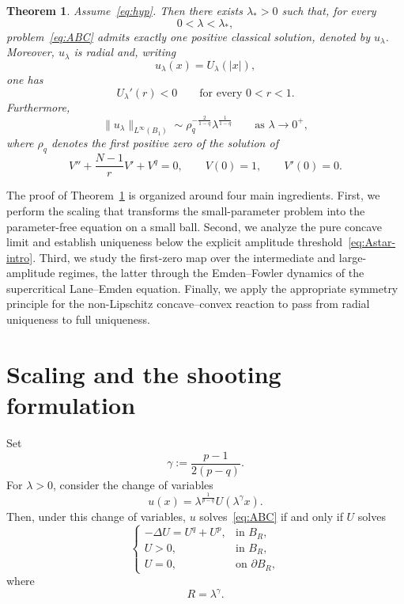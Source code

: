 \documentclass[11pt]{article}
\newtheorem{theorem}{Theorem}[section]
\theoremstyle{definition}
\begin{document}
\begin{theorem}
\label{thm:main}
Assume~\eqref{eq:hyp}. Then there exists $\lambda_*>0$ such that,
for every
\[
0<\lambda<\lambda_*,
\]
problem~\eqref{eq:ABC} admits exactly one positive classical solution,
denoted by $u_\lambda$. Moreover, $u_\lambda$ is radial and, writing
\[
u_\lambda(x)=U_\lambda(|x|),
\]
one has
\[
U_\lambda'(r)<0
\qquad
\text{for every }0<r<1.
\]
Furthermore,
\[
\|u_\lambda\|_{L^\infty(B_1)}
\sim
\rho_q^{-\frac{2}{1-q}}
\lambda^{\frac1{1-q}}
\qquad
\text{as }\lambda\to0^+,
\]
where $\rho_q$ denotes the first positive zero of the solution of
\[
V''
+\frac{N-1}{r}V'
+V^q=0,
\qquad
V(0)=1,
\qquad
V'(0)=0.
\]
\end{theorem}

The proof of Theorem~\ref{thm:main} is organized around four main
ingredients. First, we perform the scaling that transforms the
small-parameter problem into the parameter-free equation on a small
ball. Second, we analyze the pure concave limit and establish
uniqueness below the explicit amplitude threshold~\eqref{eq:Astar-intro}.
Third, we study the first-zero map over the intermediate and
large-amplitude regimes, the latter through the Emden--Fowler
dynamics of the supercritical Lane--Emden equation. Finally, we apply
the appropriate symmetry principle for the non-Lipschitz
concave--convex reaction to pass from radial uniqueness to full
uniqueness.


\section{Scaling and the shooting formulation}

Set
\begin{equation}
\label{eq:gamma}
\gamma
:=
\frac{p-1}{2(p-q)}.
\end{equation}
For $\lambda>0$, consider the change of variables
\begin{equation}
\label{eq:scaling}
u(x)
=
\lambda^{\frac1{p-q}}
U\!\left(\lambda^\gamma x\right).
\end{equation}
Then, under this change of variables, $u$ solves~\eqref{eq:ABC}
if and only if $U$ solves
\begin{equation}
\label{eq:scaled}
\begin{cases}
-\Delta U=U^q+U^p,
&\text{in }B_R,\\
U>0,
&\text{in }B_R,\\
U=0,
&\text{on }\partial B_R,
\end{cases}
\end{equation}
where
\begin{equation}
\label{eq:Rlambda}
R=\lambda^\gamma.
\end{equation}
\end{document}
